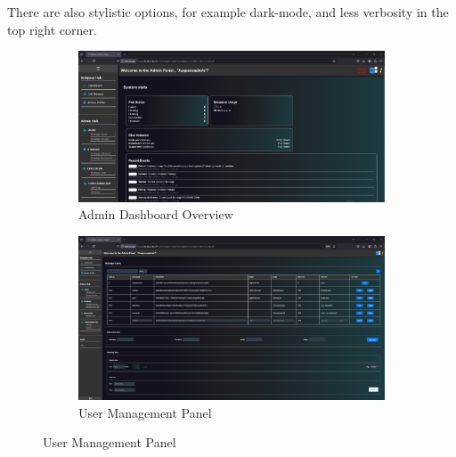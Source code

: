 There are also stylistic options, for example dark-mode, and less verbosity in the top right corner.

\begin{figure}[!htbp]
    \centering
    \begin{subfigure}[b]{0.48\textwidth}
        \includegraphics[width=\textwidth]{Images/kuspace_adminDashboard.png}
        \caption{Admin Dashboard Overview}
        \label{fig:adminviewdashboard}
    \end{subfigure}
    \hfill
    \begin{subfigure}[b]{0.48\textwidth}
        \includegraphics[width=\textwidth]{Images/kuspace_admin_ManageUsers.png}
        \caption{User Management Panel}
        \label{fig:adminmanageusers}
    \end{subfigure}

    \vspace{1em}


\end{figure}
